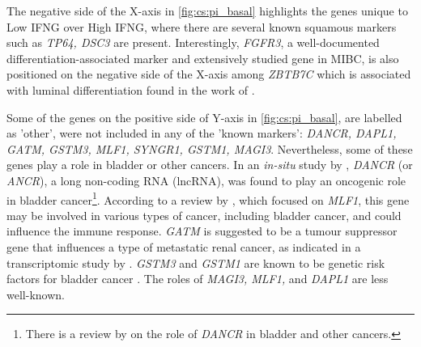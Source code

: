 The negative side of the X-axis in \cref{fig:cs:pi_basal} highlights the genes unique to Low IFNG over High IFNG, where there are several known squamous markers such as \textit{TP64, DSC3} are present. Interestingly, \textit{FGFR3}, a well-documented differentiation-associated marker and extensively studied gene in MIBC, is also positioned on the negative side of the X-axis among \textit{ZBTB7C} which is associated with luminal differentiation found in the work of \citet{Ramal2024-ha}.

Some of the genes on the positive side of Y-axis in \cref{fig:cs:pi_basal}, 
are labelled as 'other', were not included in any of the 'known markers': \textit{DANCR, DAPL1, GATM, GSTM3, MLF1, SYNGR1, GSTM1, MAGI3}. Nevertheless, some of these genes play a role in bladder or other cancers. In an \textit{in-situ} study by \citet{Zhan2018-um}, \textit{DANCR} (or \textit{ANCR}), a long non-coding RNA (lncRNA), was found to play an oncogenic role in bladder cancer\footnote{There is a review by \citet{Wang2021-gn} on the role of \textit{DANCR} in bladder and other cancers.}. According to a review by \citet{Li2023-mk}, which focused on \textit{MLF1}, this gene may be involved in various types of cancer, including bladder cancer, and could influence the immune response. \textit{GATM} is suggested to be a tumour suppressor gene that influences a type of metastatic renal cancer, as indicated in a transcriptomic study by \citet{Jee2022-wi}. \textit{GSTM3} and \textit{GSTM1} are known to be genetic risk factors for bladder cancer \citet{Schnakenberg2000-cu}. The roles of \textit{MAGI3, MLF1,} and \textit{DAPL1} are less well-known.

